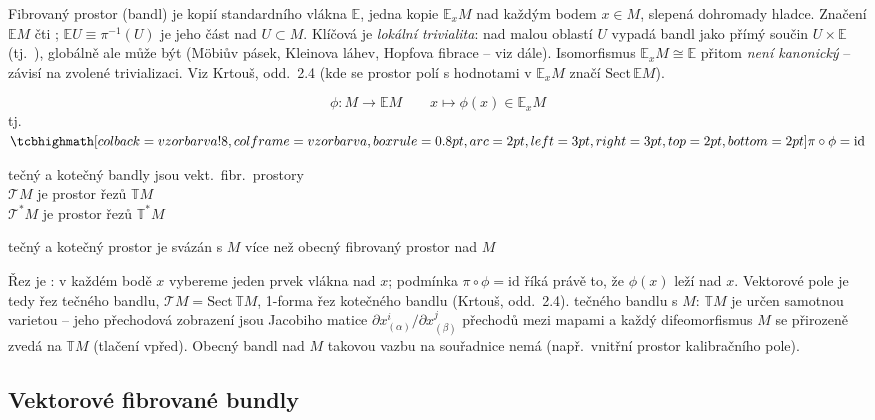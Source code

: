 \begin{vysvetleni}
Fibrovaný prostor (bandl) je  kopií standardního vlákna $\mathbb{E}$, jedna kopie $\mathbb{E}_xM$ nad každým bodem $x\in M$,
slepená dohromady hladce. Značení $\mathbb{E}M$ čti ; $\mathbb{E}U\equiv\pi^{-1}(U)$ je jeho část nad $U\subset M$.
Klíčová je \emph{lokální trivialita}: nad malou oblastí $U$ vypadá bandl jako přímý součin $U\times\mathbb{E}$ (tj.\ ),
globálně ale může být  (Möbiův pásek, Kleinova láhev, Hopfova fibrace -- viz dále).
Isomorfismus $\mathbb{E}_xM\cong\mathbb{E}$ přitom \emph{není kanonický} -- závisí na zvolené trivializaci.
Viz Krtouš, odd.~2.4 (kde se prostor polí s hodnotami v $\mathbb{E}_xM$ značí $\mathrm{Sect}\,\mathbb{E}M$).
\end{vysvetleni}

\begin{definice}
\[
  \phi: M\to\mathbb{E}M \qquad x\mapsto\phi(x)\in\mathbb{E}_xM
\]
tj.\ \quad $\vzorec{\pi\circ\phi = \mathrm{id}}$
\end{definice}

tečný a kotečný bandly jsou vekt.\ fibr.\ prostory \\
\quad $\mathcal{T}M$ je prostor řezů $\mathbb{T}M$ \\
\quad $\mathcal{T}^*M$ je prostor řezů $\mathbb{T}^*M$

tečný a kotečný prostor je svázán s $M$ více než obecný fibrovaný prostor nad $M$

\begin{vysvetleni}[Řezy = pole]
Řez je : v každém bodě $x$ vybereme jeden prvek vlákna nad $x$; podmínka $\pi\circ\phi=\mathrm{id}$ říká právě to, že $\phi(x)$ leží nad $x$.
Vektorové pole je tedy řez tečného bandlu, $\mathcal{T}M = \mathrm{Sect}\,\mathbb{T}M$, 1-forma řez kotečného bandlu (Krtouš, odd.~2.4).
 tečného bandlu s $M$: $\mathbb{T}M$ je určen samotnou varietou -- jeho přechodová zobrazení jsou Jacobiho matice
$\partial x^i_{(\alpha)}/\partial x^j_{(\beta)}$ přechodů mezi mapami a každý difeomorfismus $M$ se přirozeně zvedá na $\mathbb{T}M$ (tlačení vpřed).
Obecný bandl nad $M$ takovou vazbu na souřadnice nemá (např.\ vnitřní prostor kalibračního pole).
\end{vysvetleni}

\newpage
{}
\subsection{Vektorové fibrované bundly}

